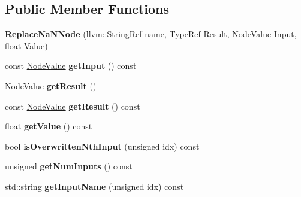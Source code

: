 \subsection*{Public Member Functions}
\begin{DoxyCompactItemize}
\item 
\mbox{\label{classglow_1_1_replace_na_n_node_acacf5fc4f9efd56b7f1d861d407e3348}} 
{\bfseries Replace\+Na\+N\+Node} (llvm\+::\+String\+Ref name, \hyperlink{structglow_1_1_type}{Type\+Ref} Result, \hyperlink{structglow_1_1_node_value}{Node\+Value} Input, float \hyperlink{classglow_1_1_value}{Value})
\item 
\mbox{\label{classglow_1_1_replace_na_n_node_ad08202722c6862d747a9fc24db51e64c}} 
const \hyperlink{structglow_1_1_node_value}{Node\+Value} {\bfseries get\+Input} () const
\item 
\mbox{\label{classglow_1_1_replace_na_n_node_a26431c66b7387074832fc2f57dfff8cb}} 
\hyperlink{structglow_1_1_node_value}{Node\+Value} {\bfseries get\+Result} ()
\item 
\mbox{\label{classglow_1_1_replace_na_n_node_a847fff2e377a1acc0245c90971eac645}} 
const \hyperlink{structglow_1_1_node_value}{Node\+Value} {\bfseries get\+Result} () const
\item 
\mbox{\label{classglow_1_1_replace_na_n_node_a4f6015f54af026da5cd03c79a4891f27}} 
float {\bfseries get\+Value} () const
\item 
\mbox{\label{classglow_1_1_replace_na_n_node_aa9d4b27bae5f710efdb255c296a698aa}} 
bool {\bfseries is\+Overwritten\+Nth\+Input} (unsigned idx) const
\item 
\mbox{\label{classglow_1_1_replace_na_n_node_aff2b0debb0f58e2cd5a1d4cd91793736}} 
unsigned {\bfseries get\+Num\+Inputs} () const
\item 
\mbox{\label{classglow_1_1_replace_na_n_node_aa56e597a71d71c475a03cb543bd6609f}} 
std\+::string {\bfseries get\+Input\+Name} (unsigned idx) const

\end{DoxyCompactItemize}
